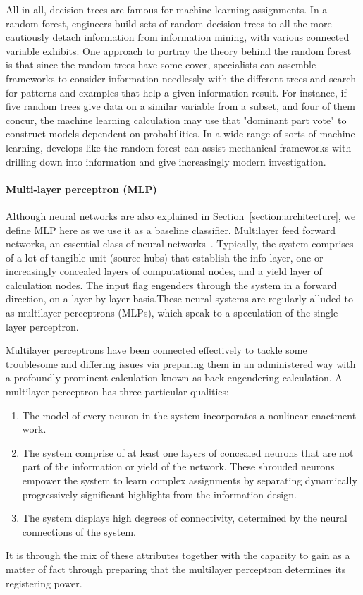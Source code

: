 All in all, decision trees are famous for machine learning assignments. In a random forest, engineers build sets of random decision trees to all the more cautiously detach information from information mining, with various connected variable exhibits. One approach to portray the theory behind the random forest is that since the random trees have some cover, specialists can assemble frameworks to consider information needlessly with the different trees and search for patterns and examples that help a given information result. For instance, if five random trees give data on a similar variable from a subset, and four of them concur, the machine learning calculation may use that "dominant part vote" to construct models dependent on probabilities. In a wide range of sorts of machine learning, develops like the random forest can assist mechanical frameworks with drilling down into information and give increasingly modern investigation.

\paragraph{Multi-layer perceptron (MLP)}
Although neural networks are also explained in Section~\ref{section:architecture}, we define MLP here as we use it as a baseline classifier. 
Multilayer feed forward networks, an essential class of neural networks~\cite{haykin1994neural}. Typically, the system comprises of a lot of tangible unit (source hubs) that establish the info layer, one or increasingly concealed layers of computational nodes, and a yield layer of calculation nodes. The input flag engenders through the system in a forward direction, on a layer-by-layer basis.These neural systems are regularly alluded to as multilayer perceptrons (MLPs), which speak to a speculation of the single-layer perceptron. 

Multilayer perceptrons have been connected effectively to tackle some troublesome and differing issues via preparing them in an administered way with a profoundly prominent calculation known as back-engendering calculation. 
A multilayer perceptron has three particular qualities: 
\begin{enumerate}
    \item The model of every neuron in the system incorporates a nonlinear enactment work. 

    \item The system comprise of at least one layers of concealed neurons that are not part of the information or yield of the network. These shrouded neurons empower the system to learn complex assignments by separating dynamically progressively significant highlights from the information design. 

    \item The system displays high degrees of connectivity, determined by the neural connections of the system. 
\end{enumerate}
It is through the mix of these attributes together with the capacity to gain as a matter of fact through preparing that the multilayer perceptron determines its registering power.

